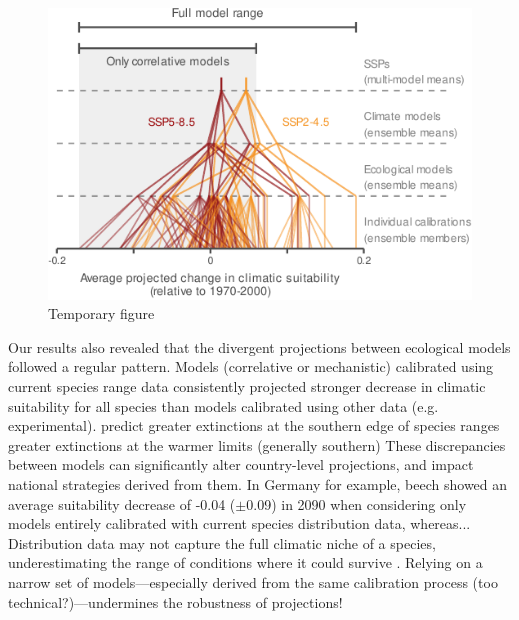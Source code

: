 \documentclass[11pt,letter]{article}
\begin{document}

\begin{figure}
	\centering
	\includegraphics[width=0.7\linewidth]{../newfigures/files/uncertaintycascade}
	\caption{Temporary figure}
	\label{fig:manag}
\end{figure}

Our results also revealed that the divergent projections between ecological models followed a regular pattern. Models (correlative or mechanistic) calibrated using current species range data consistently projected stronger decrease in climatic suitability for all species than models calibrated using other data (e.g. experimental). 
predict greater extinctions at the southern edge of species ranges
greater extinctions at the warmer limits (generally southern)
These discrepancies between models can significantly alter country-level projections, and impact national strategies derived from them. In Germany for example, beech showed an average suitability decrease of -0.04 ($\pm$0.09) in 2090 when considering only models entirely calibrated with current species distribution data, whereas...
Distribution data may not capture the full climatic niche of a species, underestimating the range of conditions where it could survive \citep{Chevalier2024, NoguesBravo2016}.
Relying on a narrow set of models---especially derived from the same calibration process (too technical?)---undermines the robustness of projections!
\end{document}
